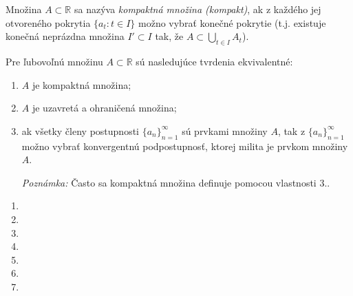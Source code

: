 Množina $A \subset \mathbb{R}$ sa nazýva \textit{kompaktná množina (kompakt)}, ak z každého jej otvoreného pokrytia $\{a_t: t \in I\}$ možno vybrať konečné pokrytie (t.j. existuje konečná neprázdna množina $I' \subset I$ tak, že $A \subset \bigcup_{t \in I} A_t$).

\begin{veta}
Pre ľubovoľnú množinu $A \subset \mathbb{R}$ sú nasledujúce tvrdenia ekvivalentné:
\begin{enumerate}
\item $A$ je kompaktná množina;
\item $A$ je uzavretá a ohraničená množina;
\item ak všetky členy postupnosti ${\{a_n\}}_{n=1}^\infty$ sú prvkami množiny $A$, tak z ${\{a_n\}}_{n=1}^\infty$ možno vybrať konvergentnú podpostupnosť, ktorej milita je prvkom množiny $A$.

\textit{Poznámka:}
Často sa kompaktná množina definuje pomocou vlastnosti $3.$.
\end{enumerate}
\end{veta}

\begin{enumerate}[resume]
	\item {}
	\item {}
	\item {}
	\item {}
	\item {}
	\item {}
	\item {}
\end{enumerate}